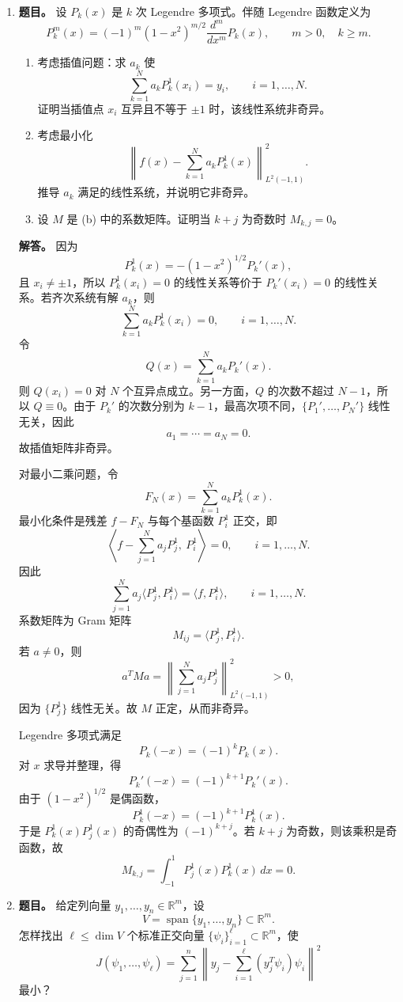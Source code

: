﻿\documentclass[UTF8,12pt]{ctexart}
\begin{document}
\begin{enumerate}[label=\textbf{\arabic*.},leftmargin=2.2em]
\item \textbf{题目。} 设 \(P_k(x)\) 是 \(k\) 次 Legendre 多项式。伴随 Legendre 函数定义为
\[
P_k^m(x)=(-1)^m(1-x^2)^{m/2}\frac{d^m}{dx^m}P_k(x),
\qquad m>0,\quad k\ge m.
\]
\begin{enumerate}[label=(\alph*),leftmargin=2.0em]
\item 考虑插值问题：求 \(a_k\) 使
\[
\sum_{k=1}^N a_kP_k^1(x_i)=y_i,\qquad i=1,\ldots,N.
\]
证明当插值点 \(x_i\) 互异且不等于 \(\pm1\) 时，该线性系统非奇异。
\item 考虑最小化
\[
\left\|f(x)-\sum_{k=1}^N a_kP_k^1(x)\right\|_{L^2(-1,1)}^2.
\]
推导 \(a_k\) 满足的线性系统，并说明它非奇异。
\item 设 \(M\) 是 (b) 中的系数矩阵。证明当 \(k+j\) 为奇数时 \(M_{k,j}=0\)。
\end{enumerate}

\textbf{解答。} 因为
\[
P_k^1(x)=-(1-x^2)^{1/2}P_k'(x),
\]
且 \(x_i\ne\pm1\)，所以 \(P_k^1(x_i)=0\) 的线性关系等价于 \(P_k'(x_i)=0\) 的线性关系。若齐次系统有解 \(a_k\)，则
\[
\sum_{k=1}^N a_kP_k^1(x_i)=0,\qquad i=1,\ldots,N.
\]
令
\[
Q(x)=\sum_{k=1}^N a_kP_k'(x).
\]
则 \(Q(x_i)=0\) 对 \(N\) 个互异点成立。另一方面，\(Q\) 的次数不超过 \(N-1\)，所以 \(Q\equiv0\)。由于 \(P_k'\) 的次数分别为 \(k-1\)，最高次项不同，\(\{P_1',\ldots,P_N'\}\) 线性无关，因此
\[
a_1=\cdots=a_N=0.
\]
故插值矩阵非奇异。

对最小二乘问题，令
\[
F_N(x)=\sum_{k=1}^N a_kP_k^1(x).
\]
最小化条件是残差 \(f-F_N\) 与每个基函数 \(P_i^1\) 正交，即
\[
\left\langle f-\sum_{j=1}^N a_jP_j^1,\ P_i^1\right\rangle=0,
\qquad i=1,\ldots,N.
\]
因此
\[
\sum_{j=1}^N a_j\langle P_j^1,P_i^1\rangle
=\langle f,P_i^1\rangle,\qquad i=1,\ldots,N.
\]
系数矩阵为 Gram 矩阵
\[
M_{ij}=\langle P_j^1,P_i^1\rangle.
\]
若 \(a\ne0\)，则
\[
a^TMa=\left\|\sum_{j=1}^N a_jP_j^1\right\|_{L^2(-1,1)}^2>0,
\]
因为 \(\{P_j^1\}\) 线性无关。故 \(M\) 正定，从而非奇异。

Legendre 多项式满足
\[
P_k(-x)=(-1)^kP_k(x).
\]
对 \(x\) 求导并整理，得
\[
P_k'(-x)=(-1)^{k+1}P_k'(x).
\]
由于 \((1-x^2)^{1/2}\) 是偶函数，
\[
P_k^1(-x)=(-1)^{k+1}P_k^1(x).
\]
于是 \(P_k^1(x)P_j^1(x)\) 的奇偶性为 \((-1)^{k+j}\)。若 \(k+j\) 为奇数，则该乘积是奇函数，故
\[
M_{k,j}=\int_{-1}^1P_j^1(x)P_k^1(x)\,dx=0.
\]

\item \textbf{题目。} 给定列向量 \(y_1,\ldots,y_n\in\mathbb R^m\)，设
\[
V=\operatorname{span}\{y_1,\ldots,y_n\}\subset\mathbb R^m.
\]
怎样找出 \(\ell\le\dim V\) 个标准正交向量 \(\{\psi_i\}_{i=1}^\ell\subset\mathbb R^m\)，使
\[
J(\psi_1,\ldots,\psi_\ell)
=\sum_{j=1}^n
\left\|y_j-\sum_{i=1}^\ell (y_j^T\psi_i)\psi_i\right\|^2
\]
最小？


\end{enumerate}
\end{document}
